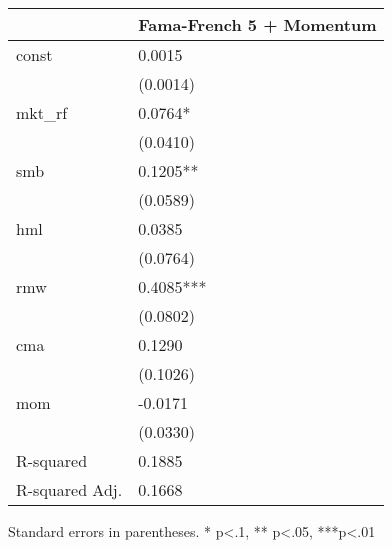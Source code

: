 \begin{table}
\caption{}
\label{}
\begin{center}
\begin{tabular}{ll}
\hline
               & Fama-French 5 + Momentum  \\
\hline
const          & 0.0015                    \\
               & (0.0014)                  \\
mkt\_rf        & 0.0764*                   \\
               & (0.0410)                  \\
smb            & 0.1205**                  \\
               & (0.0589)                  \\
hml            & 0.0385                    \\
               & (0.0764)                  \\
rmw            & 0.4085***                 \\
               & (0.0802)                  \\
cma            & 0.1290                    \\
               & (0.1026)                  \\
mom            & -0.0171                   \\
               & (0.0330)                  \\
R-squared      & 0.1885                    \\
R-squared Adj. & 0.1668                    \\
\hline
\end{tabular}
\end{center}
\end{table}
\bigskip
Standard errors in parentheses. \newline 
* p<.1, ** p<.05, ***p<.01